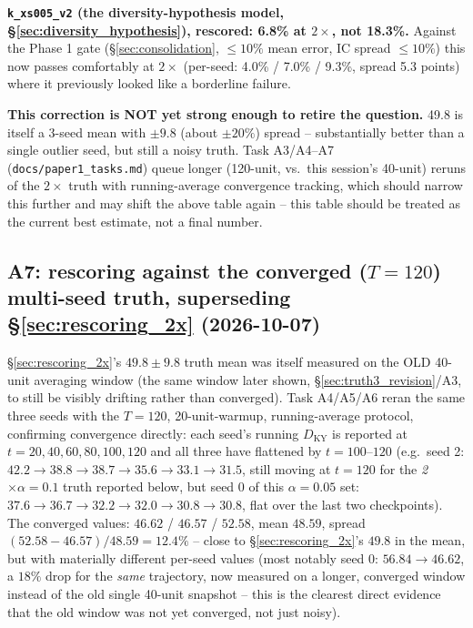 \documentclass[11pt]{article}
\begin{document}
\textbf{\texttt{k\_xs005\_v2} (the diversity-hypothesis model,
\S\ref{sec:diversity_hypothesis}), rescored: 6.8\% at $2\times$, not
18.3\%.} Against the Phase 1 gate (\S\ref{sec:consolidation}, $\le10\%$
mean error, IC spread $\le10\%$) this now passes comfortably at
$2\times$ (per-seed: 4.0\% / 7.0\% / 9.3\%, spread 5.3 points) where it
previously looked like a borderline failure.

\textbf{This correction is NOT yet strong enough to retire the question.}
49.8 is itself a 3-seed mean with $\pm9.8$ (about $\pm20\%$) spread --
substantially better than a single outlier seed, but still a noisy
truth. Task A3/A4--A7 (\texttt{docs/paper1\_tasks.md}) queue longer
(120-unit, vs.\ this session's 40-unit) reruns of the $2\times$ truth
with running-average convergence tracking, which should narrow this
further and may shift the above table again -- this table should be
treated as the current best estimate, not a final number.

\subsection{A7: rescoring against the converged ($T{=}120$) multi-seed
truth, superseding \S\ref{sec:rescoring_2x} (2026-10-07)}
\label{sec:rescoring_2x_v2}

\S\ref{sec:rescoring_2x}'s $49.8\pm9.8$ truth mean was itself measured on
the OLD 40-unit averaging window (the same window later shown,
\S\ref{sec:truth3_revision}/A3, to still be visibly drifting rather than
converged). Task A4/A5/A6 reran the same three seeds with the $T{=}120$,
20-unit-warmup, running-average protocol, confirming convergence
directly: each seed's running $D_{\mathrm{KY}}$ is reported at
$t{=}20,40,60,80,100,120$ and all three have flattened by $t{=}100$--$120$
(e.g.\ seed 2: $42.2\to38.8\to38.7\to35.6\to33.1\to31.5$, still moving at
$t{=}120$ for the \emph{2$\times\alpha{=}0.1$} truth reported below, but
seed 0 of this $\alpha{=}0.05$ set: $37.6\to36.7\to32.2\to32.0\to30.8\to30.8$,
flat over the last two checkpoints). The converged values:
$46.62$ / $46.57$ / $52.58$, mean $\mathbf{48.59}$, spread
$(52.58-46.57)/48.59 = 12.4\%$ -- close to \S\ref{sec:rescoring_2x}'s
$49.8$ in the mean, but with materially different per-seed values (most
notably seed 0: $56.84\to46.62$, a $18\%$ drop for the \emph{same}
trajectory, now measured on a longer, converged window instead of the
old single 40-unit snapshot -- this is the clearest direct evidence that
the old window was not yet converged, not just noisy).
\end{document}
